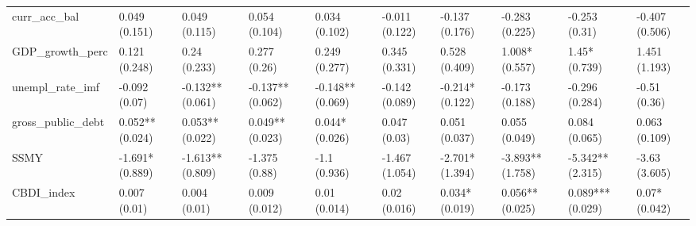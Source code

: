 \begin{table}[ht]
\begin{tabular}{llllllllll}
  curr\_acc\_bal & 0.049 (0.151) & 0.049 (0.115) & 0.054 (0.104) & 0.034 (0.102) & -0.011 (0.122) & -0.137 (0.176) & -0.283 (0.225) & -0.253 (0.31) & -0.407 (0.506) \\ 
  GDP\_growth\_perc & 0.121 (0.248) & 0.24 (0.233) & 0.277 (0.26) & 0.249 (0.277) & 0.345 (0.331) & 0.528 (0.409) & 1.008* (0.557) & 1.45* (0.739) & 1.451 (1.193) \\ 
  unempl\_rate\_imf & -0.092 (0.07) & -0.132** (0.061) & -0.137** (0.062) & -0.148** (0.069) & -0.142 (0.089) & -0.214* (0.122) & -0.173 (0.188) & -0.296 (0.284) & -0.51 (0.36) \\ 
  gross\_public\_debt & 0.052** (0.024) & 0.053** (0.022) & 0.049** (0.023) & 0.044* (0.026) & 0.047 (0.03) & 0.051 (0.037) & 0.055 (0.049) & 0.084 (0.065) & 0.063 (0.109) \\ 
  SSMY & -1.691* (0.889) & -1.613** (0.809) & -1.375 (0.88) & -1.1 (0.936) & -1.467 (1.054) & -2.701* (1.394) & -3.893** (1.758) & -5.342** (2.315) & -3.63 (3.605) \\ 
  CBDI\_index & 0.007 (0.01) & 0.004 (0.01) & 0.009 (0.012) & 0.01 (0.014) & 0.02 (0.016) & 0.034* (0.019) & 0.056** (0.025) & 0.089*** (0.029) & 0.07* (0.042) \\ 
   \bottomrule
\end{tabular}
\endgroup
\end{table}
